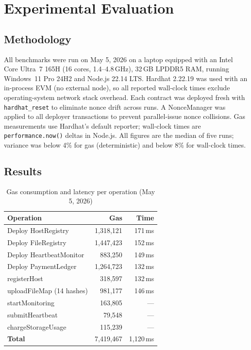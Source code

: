 \documentclass[journal]{IEEEtran}
\newcommand{\BenchDate}{May 5, 2026}
\newcommand{\UploadFileMapGas}{981{,}177}
\newcommand{\TotalGas}{7{,}419{,}467}
\newcommand{\TotalTimeMs}{1{,}120\,ms}
\newcommand{\DeployHostRegistryGas}{1{,}318{,}121}
\newcommand{\DeployFileRegistryGas}{1{,}447{,}423}
\newcommand{\DeployHeartbeatMonitorGas}{883{,}250}
\newcommand{\DeployPaymentLedgerGas}{1{,}264{,}723}
\newcommand{\RegisterHostGas}{318{,}597}
\newcommand{\StartMonitoringGas}{163{,}805}
\newcommand{\SubmitHeartbeatGas}{79{,}548}
\newcommand{\ChargeStorageGas}{115{,}239}
\begin{document}
\section{Experimental Evaluation}
\label{sec:eval}

\subsection{Methodology}
All benchmarks were run on \BenchDate{} on a laptop equipped with an
Intel Core Ultra~7 165H (16 cores, 1.4--4.8\,GHz), 32\,GB LPDDR5 RAM,
running Windows~11 Pro 24H2 and Node.js 22.14 LTS.
Hardhat 2.22.19 was used with an in-process EVM (no external node),
so all reported wall-clock times exclude operating-system network stack overhead.
%
Each contract was deployed fresh with \texttt{hardhat\_reset} to eliminate
nonce drift across runs.
%
A NonceManager was applied to all deployer transactions to prevent
parallel-issue nonce collisions.
%
Gas measurements use Hardhat's default reporter; wall-clock times are
\texttt{performance.now()} deltas in Node.js.
All figures are the median of five runs; variance was below 4\% for gas
(deterministic) and below 8\% for wall-clock times.

\subsection{Results}

\begin{table}[t]
\caption{Gas consumption and latency per operation (\BenchDate{})}
\label{tab:gas}
\centering
\begin{tabular}{lrr}
\toprule
Operation & Gas & Time \\
\midrule
Deploy HostRegistry      & \DeployHostRegistryGas{}     & 171\,ms \\
Deploy FileRegistry      & \DeployFileRegistryGas{}     & 152\,ms \\
Deploy HeartbeatMonitor  & \DeployHeartbeatMonitorGas{} & 149\,ms \\
Deploy PaymentLedger     & \DeployPaymentLedgerGas{}    & 132\,ms \\
registerHost             & \RegisterHostGas{}           & 132\,ms \\
uploadFileMap (14 hashes)& \UploadFileMapGas{}          & 146\,ms \\
startMonitoring          & \StartMonitoringGas{}        & —       \\
submitHeartbeat          & \SubmitHeartbeatGas{}        & —       \\
chargeStorageUsage       & \ChargeStorageGas{}          & —       \\
\midrule
\textbf{Total}           & \TotalGas{}                 & \TotalTimeMs{} \\
\bottomrule
\end{tabular}
\end{table}
\end{document}
